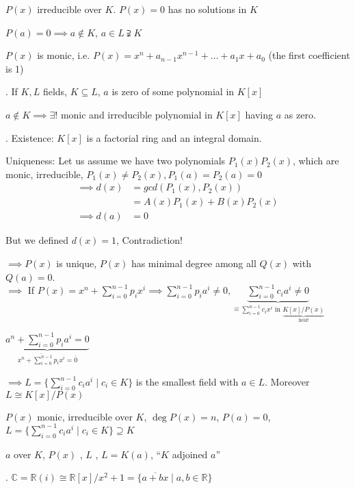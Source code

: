 $P(x)$ irreducible over $K$. $P(x) = 0$ has no solutions in $K$

$P(a) = 0 \implies a\notin K$, $ a \in L \supsetneqq K$

$P(x)$ is monic, i.e. $P(x) = x^n + a_{n-1}x^{n-1} + \ldots + a_1 x + a_0$ (the first coefficient is 1)

\Theorem.
If $K,L$ fields, $K\subseteq L$, $a$ is zero of some polynomial in $K[x]$

$a \notin K \implies \exists!$ monic and irreducible polynomial in $K[x]$ having $a$ as zero.

\Proof.
Existence: $K[x]$ is a factorial ring and an integral domain.

Uniqueness: Let us assume we have two polynomials $P_1(x) P_2(x)$, which are monic, irreducible, $P_1(x) \neq P_2(x), P_1(a) = P_2(a) = 0$
\begin{align*}
  \implies d(x) &= gcd(P_1(x), P_2(x))\\
                &= A(x) P_1(x) + B(x) P_2(x) \\
  \implies d(a) &= 0
\end{align*}

But we defined $d(x) = 1$, Contradiction!

$\implies P(x)$ is unique, $P(x)$ has minimal degree among all $Q(x)$ with $Q(a) = 0$. \\
$\implies$ If $P(x) = x^n + \sum_{i=0}^{n-1} p_i x^i \implies \sum_{i=0}^{n-1} p_i a^i \neq 0, \underbrace{\sum_{i=0}^{n-1} c_i a^i \neq 0}_{\hat{=} \sum_{i=0}^{n-1} c_i x^i \text{ in } \underbrace{K[x]/P(x)}_{\text{field!}}}$

$\underbrace{a^n + \sum_{i=0}^{n-1} p_i a^i = 0}_{\overline{x^n + \sum_{i=0}^{n-1} p_i x^i} = \bar{0}}$

$\implies L = \{ \sum_{i=0}^{n-1} c_i a^i \mid c_i \in K\}$ is the smallest field with $a \in L$. Moreover $L \cong K[x]/P(x)$

\begin{definition}
  $P(x)$ monic, irreducible over $K$, $\deg P(x) = n$, $P(a) = 0$,
  $L = \{ \sum_{i=0}^{n-1} c_i a^i\mid c_i \in K \} \supseteq K$

  $a$  over $K$, $P(x)$ , $L$ , $L = K(a)$, ``$K$ adjoined $a$''
\end{definition}

\Example.
$\mathbb{C} = \mathbb{R}(i) \cong \mathbb{R}[x] / x^2 +1 = \{\overline{a+bx} \mid a,b \in \mathbb{R} \}$

